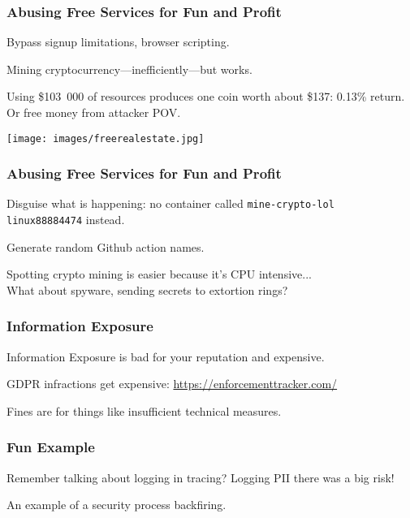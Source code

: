\begin{frame}
\frametitle{Abusing Free Services for Fun and Profit}

Bypass signup limitations, browser scripting.

Mining cryptocurrency---inefficiently---but works.


Using \$103~000 of resources produces one coin worth about \$137: 0.13\% return.\\
\quad Or free money from attacker POV.

\begin{center}
	\texttt{[image: images/freerealestate.jpg]}
\end{center}

\end{frame}


\begin{frame}
\frametitle{Abusing Free Services for Fun and Profit}

Disguise what is happening: no container called \texttt{mine-crypto-lol}\\
\quad \texttt{linux88884474} instead.

Generate random Github action names.

Spotting crypto mining is easier because it's CPU intensive...\\
\quad What about spyware, sending secrets to extortion rings?


\end{frame}



\begin{frame}
\frametitle{Information Exposure}

Information Exposure is bad for your reputation and expensive.

GDPR infractions get expensive: \url{https://enforcementtracker.com/}

Fines are for things like insufficient technical measures.

\end{frame}


\begin{frame}
\frametitle{Fun Example}

Remember talking about logging in tracing? Logging PII there was a big risk!

An example of a security process backfiring.


\end{frame}



